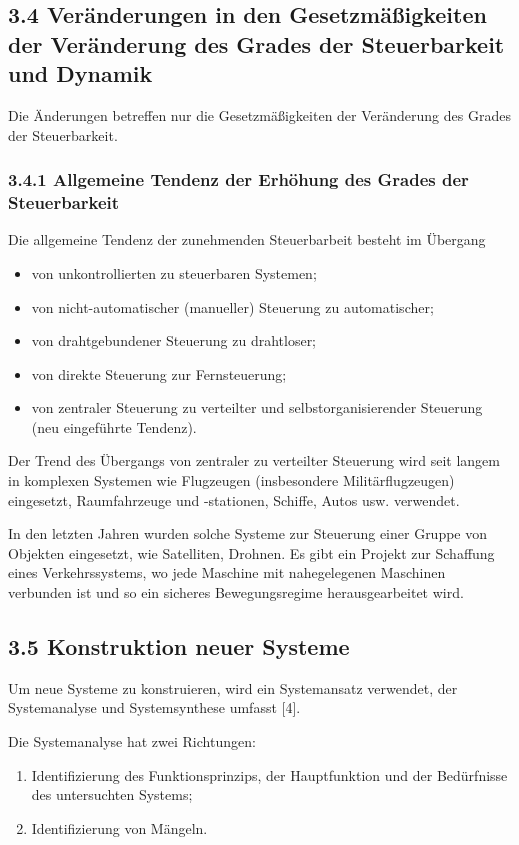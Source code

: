 \documentclass[11pt,a4paper]{article}
\begin{document}
\subsection{3.4 Veränderungen in den Gesetzmäßigkeiten der Veränderung des
  Grades der Steuerbarkeit und Dynamik}

Die Änderungen betreffen nur die Gesetzmäßigkeiten der Veränderung des Grades
der Steuerbarkeit.

\subsubsection{3.4.1 Allgemeine Tendenz der Erhöhung des Grades der
  Steuerbarkeit} 

Die allgemeine Tendenz der zunehmenden Steuerbarbeit besteht im Übergang
\begin{itemize}
\item von unkontrollierten zu steuerbaren Systemen;
\item von nicht-automatischer (manueller) Steuerung zu automatischer;
\item von drahtgebundener Steuerung zu drahtloser;
\item von direkte Steuerung zur Fernsteuerung;
\item von zentraler Steuerung zu verteilter und selbstorganisierender
  Steuerung (neu eingeführte Tendenz).
\end{itemize}

Der Trend des Übergangs von zentraler zu verteilter Steuerung wird seit langem
in komplexen Systemen wie Flugzeugen (insbesondere Militärflugzeugen)
eingesetzt, Raumfahrzeuge und -stationen, Schiffe, Autos usw. verwendet.

In den letzten Jahren wurden solche Systeme zur Steuerung einer Gruppe von
Objekten eingesetzt, wie Satelliten, Drohnen. Es gibt ein Projekt zur
Schaffung eines Verkehrssystems, wo jede Maschine mit nahegelegenen Maschinen
verbunden ist und so ein sicheres Bewegungsregime herausgearbeitet wird.

\subsection{3.5 Konstruktion neuer Systeme}

Um neue Systeme zu konstruieren, wird ein Systemansatz verwendet, der
Systemanalyse und Systemsynthese umfasst [4].

Die Systemanalyse hat zwei Richtungen:
\begin{enumerate}
\item Identifizierung des Funktionsprinzips, der Hauptfunktion und der
  Bedürfnisse des untersuchten Systems;
\item Identifizierung von Mängeln.
\end{enumerate}
\end{document}
